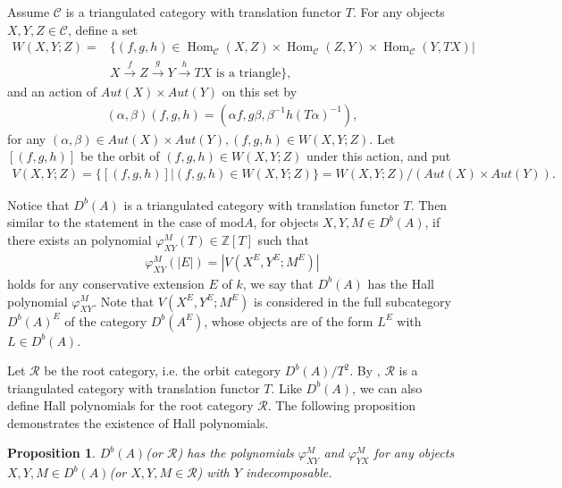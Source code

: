 \documentclass[12pt]{amsart}
\newtheorem{proposition}[theorem]{Proposition}
\begin{document}
Assume $\mathcal{C}$ is a triangulated category with translation functor $T$.
For any objects $X,Y,Z \in \mathcal{C}$, define a set
\begin{align*}
    W(X,Y;Z)=& \{(f,g,h)\in \operatorname{Hom}_{\mathcal{C}}(X,Z) \times \operatorname{Hom}_{\mathcal{C}}(Z,Y) \times \operatorname{Hom}_{\mathcal{C}}(Y,TX)| \\
    &  X \xrightarrow{f} Z \xrightarrow{g} Y \xrightarrow{h} TX \text{ is a triangle}\}, 
\end{align*}
and an action of $Aut(X)\times Aut(Y)$ on this set by 
\begin{align*}
    (\alpha,\beta)(f,g,h) = (\alpha f,g \beta, \beta^{-1}h(T\alpha)^{-1}),
\end{align*}
for any $(\alpha,\beta)\in Aut(X)\times Aut(Y),(f,g,h)\in W(X,Y;Z)$.
Let $[(f,g,h)]$ be the orbit of $(f,g,h)\in W(X,Y;Z)$ under this action, and put 
\begin{align*}
    V(X,Y;Z) = \{ [(f,g,h)] | (f,g,h)\in W(X,Y;Z)   \} = W(X,Y;Z)/(Aut(X)\times Aut(Y)).
\end{align*}

Notice that $D^b(A)$ is a triangulated category with translation functor $T$.
Then similar to the statement in the case of mod$A$, for objects $X,Y,M\in D^b(A)$, if there exists an polynomial $\varphi_{XY}^M(T)\in \mathbb{Z}[T]$ such that 
\begin{align*}
    \varphi_{XY}^M(|E|) = |V(X^E,Y^E;M^E)|
\end{align*}
holds for any conservative extension $E$ of $k$, we say that $D^b(A)$ has the Hall polynomial $\varphi_{XY}^M$.
Note that $V(X^E,Y^E;M^E)$ is considered in the full subcategory $D^b(A)^E$ of the category $D^b(A^E)$, whose objects are of the form $L^E$ with $L\in D^b(A)$.

Let $\mathcal{R}$ be the root category, i.e. the orbit category $D^b(A)/T^2$. 
By \cite[Prop 7.1]{1997ROOT}, $\mathcal{R}$ is a triangulated category with translation functor $T$.
Like $D^b(A)$, we can also define Hall polynomials for the root category $\mathcal{R}$.  
The following proposition demonstrates the existence of Hall polynomials.

\begin{proposition}\cite[Proposition 3.1, 3.2]{1997ROOT}
     $D^b(A)$(or $\mathcal{R}$) has the polynomials $\varphi_{XY}^M$ and $\varphi_{YX}^M$ for any objects $X,Y,M\in D^b(A)$(or $X,Y,M\in \mathcal{R}$) with $Y$ indecomposable.
\end{proposition}
\end{document}
